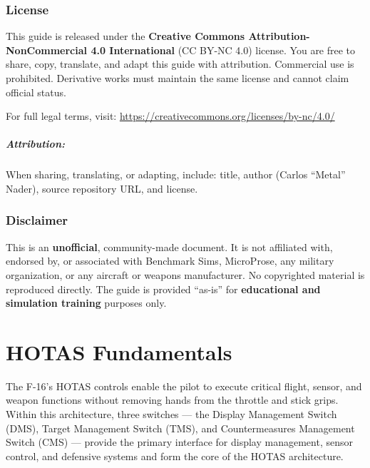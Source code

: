 \documentclass[11pt, a4paper, twoside]{report}
\begin{document}
\subsection{License}
\label{sec:C1-S4-S4}

This guide is released under the \textbf{Creative Commons Attribution-NonCommercial 4.0 International} (CC BY-NC 4.0) license. You are free to share, copy, translate, and adapt this guide with attribution. Commercial use is prohibited. Derivative works must maintain the same license and cannot claim official status.

For full legal terms, visit: \url{https://creativecommons.org/licenses/by-nc/4.0/}

\paragraph{Attribution:}
When sharing, translating, or adapting, include: title, author (Carlos ``Metal'' Nader), source repository URL, and license.

\subsection{Disclaimer}
\label{sec:C1-S4-S5}

This is an \textbf{unofficial}, community-made document. It is not affiliated with, endorsed by, or associated with Benchmark Sims, MicroProse, any military organization, or any aircraft or weapons manufacturer. No copyrighted material is reproduced directly. The guide is provided ``as-is'' for \textbf{educational and simulation training} purposes only.

\newpage
\chapter{HOTAS Fundamentals}
\label{chap:C2}

The F-16's HOTAS controls enable the pilot to execute critical flight, sensor, and weapon functions without removing hands from the throttle and stick grips. Within this architecture, three switches — the Display Management Switch (DMS), Target Management Switch (TMS), and Countermeasures Management Switch (CMS) — provide the primary interface for display management, sensor control, and defensive systems and form the core of the HOTAS architecture.
\end{document}
